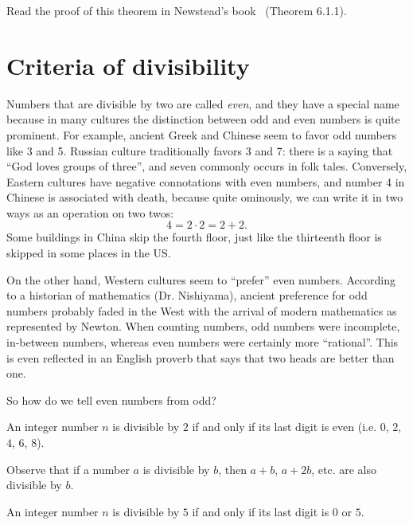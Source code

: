 \begin{exercise}
    Read the proof of this theorem in Newstead's book~\cite{Newstead} (Theorem 6.1.1).
\end{exercise}



\section{Criteria of divisibility}

Numbers that are divisible by two are called \emph{even}, and they have a special name because in many cultures the distinction between odd and even numbers is quite prominent. For example, ancient Greek and Chinese seem to favor odd numbers like 3 and 5. Russian culture traditionally favors 3 and 7: there is a saying that ``God loves groups of three'', and seven commonly occurs in folk tales. Conversely, Eastern cultures have negative connotations with even numbers, and number 4 in Chinese is associated with death, because quite ominously, we can write it in two ways as an operation on two twos:
$$ 4 = 2\cdot 2= 2+2
.$$
Some buildings in China skip the fourth floor, just like the thirteenth floor is skipped in some places in the US.

On the other hand, Western cultures seem to ``prefer'' even numbers. According to a historian of mathematics (Dr. Nishiyama), ancient preference for odd numbers probably faded in the West with the arrival of modern mathematics as represented by Newton. When counting numbers, odd numbers were incomplete, in-between numbers, whereas even numbers were certainly more ``rational''. This is even reflected in an English proverb that says that two heads are better than one.

So how do we tell even numbers from odd?

\begin{proposition}
An integer number $n$ is divisible by $2$ if and only if its last digit is even (i.e. $0$, $2$, $4$, $6$, $8$).
\end{proposition}

\begin{lemma}
Observe that if a number $a$ is divisible by $b$, then $a + b$, $a + 2b$, etc. are also divisible by $b$. 
\end{lemma}

\begin{proposition}
An integer number $n$ is divisible by $5$ if and only if its last digit is $0$ or $5$.
\end{proposition}



